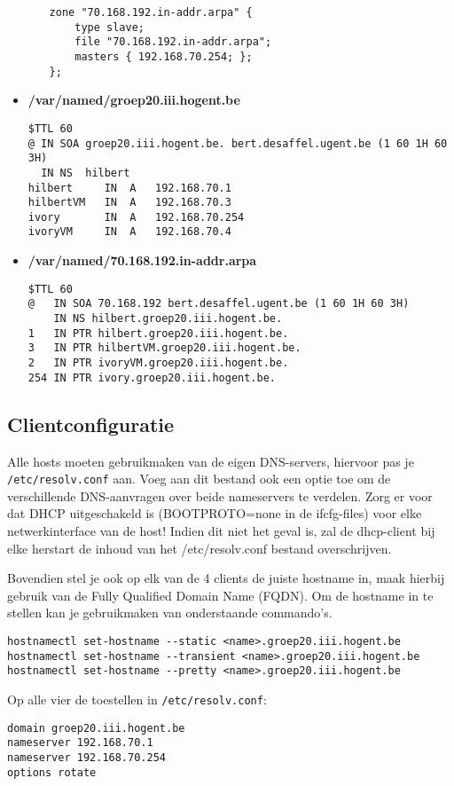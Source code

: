 \documentclass{report}
\begin{document}
\begin{itemize}
\begin{itemize}
\begin{lstlisting}
zone "70.168.192.in-addr.arpa" {
	type slave;
	file "70.168.192.in-addr.arpa";
	masters { 192.168.70.254; };
};
		\end{lstlisting}
	\end{itemize}
	\item \textbf{/var/named/groep20.iii.hogent.be}
	\begin{lstlisting}
$TTL 60
@ IN SOA groep20.iii.hogent.be. bert.desaffel.ugent.be (1 60 1H 60 3H)
  IN NS	 hilbert
hilbert 	IN	A	192.168.70.1
hilbertVM 	IN	A	192.168.70.3
ivory 		IN	A	192.168.70.254
ivoryVM	 	IN	A	192.168.70.4
	\end{lstlisting}
	\item \textbf{/var/named/70.168.192.in-addr.arpa}
	\begin{lstlisting}
$TTL 60
@   IN SOA 70.168.192 bert.desaffel.ugent.be (1 60 1H 60 3H)
    IN NS hilbert.groep20.iii.hogent.be.	
1   IN PTR hilbert.groep20.iii.hogent.be.
3   IN PTR hilbertVM.groep20.iii.hogent.be.
2   IN PTR ivoryVM.groep20.iii.hogent.be.
254 IN PTR ivory.groep20.iii.hogent.be.
	\end{lstlisting}	
\end{itemize}

\subsection{Clientconfiguratie}
Alle hosts moeten gebruikmaken van de eigen DNS-servers, hiervoor pas je \texttt{/etc/resolv.conf} aan. Voeg aan dit bestand ook een optie toe om de verschillende DNS-aanvragen over beide nameservers te verdelen.
Zorg er voor dat DHCP uitgeschakeld is (BOOTPROTO=none in de ifcfg-files) voor elke netwerkinterface van de host! Indien dit niet het geval is, zal de dhcp-client bij elke herstart de inhoud van het /etc/resolv.conf bestand overschrijven.

Bovendien stel je ook op elk van de 4 clients de juiste hostname in, maak hierbij gebruik van de Fully Qualified Domain Name (FQDN). Om de hostname in te stellen kan je gebruikmaken van onderstaande commando's. 
\begin{lstlisting}
hostnamectl set-hostname --static <name>.groep20.iii.hogent.be
hostnamectl set-hostname --transient <name>.groep20.iii.hogent.be
hostnamectl set-hostname --pretty <name>.groep20.iii.hogent.be
\end{lstlisting}
Op alle vier de toestellen in \texttt{/etc/resolv.conf}:
\begin{lstlisting}
domain groep20.iii.hogent.be
nameserver 192.168.70.1
nameserver 192.168.70.254
options rotate
\end{lstlisting}
\end{document}
